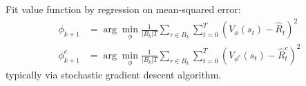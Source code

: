 \begin{algorithm}
{    
    Fit value function by regression on mean-squared error:
    \begin{equation*}
      \begin{aligned}
        \phi_{k + 1} &= \arg\min_\phi \frac{1}{|B_k|T} \sum_{\tau \in B_k} \sum^T_{t = 0} \left( V_\phi(s_t) - \hat{R}_t \right)^2 \\
        \phi^c_{k + 1} &= \arg\min_\phi \frac{1}{|B_k|T} \sum_{\tau \in B_k} \sum^T_{t = 0} \left( V_{\phi^c}(s_t) - \hat{R}^c_t \right)^2
      \end{aligned}
    \end{equation*}
    typically via stochastic gradient descent algorithm.
  }
\end{algorithm}